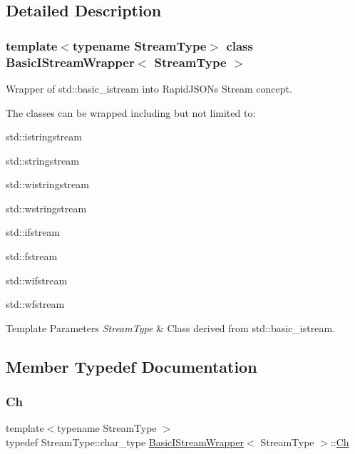 \subsection{Detailed Description}
\subsubsection*{template$<$typename Stream\+Type$>$\newline
class Basic\+I\+Stream\+Wrapper$<$ Stream\+Type $>$}

Wrapper of {\ttfamily std\+::basic\+\_\+istream} into Rapid\+J\+S\+ON\textquotesingle{}s Stream concept. 

The classes can be wrapped including but not limited to\+:


\begin{DoxyItemize}
\item {\ttfamily std\+::istringstream} 
\item {\ttfamily std\+::stringstream} 
\item {\ttfamily std\+::wistringstream} 
\item {\ttfamily std\+::wstringstream} 
\item {\ttfamily std\+::ifstream} 
\item {\ttfamily std\+::fstream} 
\item {\ttfamily std\+::wifstream} 
\item {\ttfamily std\+::wfstream} 
\end{DoxyItemize}


\begin{DoxyTemplParams}{Template Parameters}
{\em Stream\+Type} & Class derived from {\ttfamily std\+::basic\+\_\+istream}. \\
\hline
\end{DoxyTemplParams}


\subsection{Member Typedef Documentation}
\mbox{\label{classBasicIStreamWrapper_a88e4288ecdaa0d31ddf4e5917b9aa8d7}} 
\subsubsection{\texorpdfstring{Ch}{Ch}}
{\footnotesize\ttfamily template$<$typename Stream\+Type $>$ \\
typedef Stream\+Type\+::char\+\_\+type \hyperlink{classBasicIStreamWrapper}{Basic\+I\+Stream\+Wrapper}$<$ Stream\+Type $>$\+::\hyperlink{classBasicIStreamWrapper_a88e4288ecdaa0d31ddf4e5917b9aa8d7}{Ch}}



